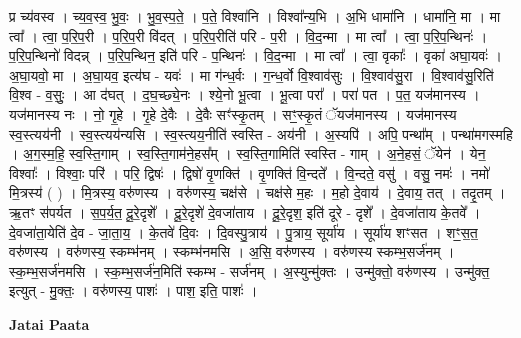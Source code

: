 \documentclass[17pt]{extarticle}
\begin{document}
प्र च्य॑वस्व । च्य॒व॒स्व॒ भु॒वः॒ । भु॒व॒स्प॒ते॒ । प॒ते॒ विश्वा॑नि । विश्वा᳚न्य॒भि । अ॒भि धामा॑नि । धामा॑नि॒ मा । मा त्वा᳚ । त्वा॒ प॒रि॒प॒री । प॒रि॒प॒री वि॑दत् । प॒रि॒प॒रीति॑ परि - प॒री । वि॒द॒न्मा । मा त्वा᳚ । त्वा॒ प॒रि॒प॒न्थिनः॑ । प॒रि॒प॒न्थिनो॑ विदन्न् । प॒रि॒प॒न्थिन॒ इति॑ परि - प॒न्थिनः॑ । वि॒द॒न्मा । मा त्वा᳚ । त्वा॒ वृकाः᳚ । वृका॑ अघा॒यवः॑ । अ॒घा॒यवो॒ मा । अ॒घा॒यव॒ इत्य॑घ - यवः॑ । मा ग॑न्ध॒र्वः । ग॒न्ध॒र्वो वि॒श्वाव॑सुः । वि॒श्वाव॑सु॒रा । वि॒श्वाव॑सु॒रिति॑ वि॒श्व - व॒सुः॒ । आ द॑घत् । द॒घ॒च्छ्ये॒नः । श्ये॒नो भू॒त्वा । भू॒त्वा परा᳚ । परा॑ पत । प॒त॒ यज॑मानस्य । यज॑मानस्य नः । नो॒ गृ॒हे । गृ॒हे दे॒वैः । दे॒वैः सꣳ॑स्कृ॒तम् । सꣳ॒॒स्कृ॒तं ॅयज॑मानस्य । यज॑मानस्य स्व॒स्त्यय॑नी । स्व॒स्त्यय॑न्यसि । स्व॒स्त्यय॒नीति॑ स्वस्ति - अय॑नी । अ॒स्यपि॑ । अपि॒ पन्था᳚म् । पन्था॑मगस्महि । अ॒ग॒स्म॒हि॒ स्व॒स्ति॒गाम् । स्व॒स्ति॒गाम॑ने॒हस᳚म् । स्व॒स्ति॒गामिति॑ स्वस्ति - गाम् । अ॒ने॒हसं॒ ॅयेन॑ । येन॒ विश्वाः᳚ । विश्वाः॒ परि॑ । परि॒ द्विषः॑ । द्विषो॑ वृ॒णक्ति॑ । वृ॒णक्ति॑ वि॒न्दते᳚ । वि॒न्दते॒ वसु॑ । वसु॒ नमः॑ । नमो॑ मि॒त्रस्य॑ ( ) । मि॒त्रस्य॒ वरु॑णस्य । वरु॑णस्य॒ चक्ष॑से । चक्ष॑से म॒हः । म॒हो दे॒वाय॑ । दे॒वाय॒ तत् । तदृ॒तम् । ऋ॒तꣳ स॑पर्यत । स॒प॒र्य॒त॒ दू॒रे॒दृशे᳚ । दू॒रे॒दृशे॑ दे॒वजा॑ताय । दू॒रे॒दृश॒ इति॑ दूरे - दृशे᳚ । दे॒वजा॑ताय के॒तवे᳚ । दे॒वजा॑ता॒येति॑ दे॒व - जा॒ता॒य॒ । के॒तवे॑ दि॒वः । दि॒वस्पु॒त्राय॑ । पु॒त्राय॒ सूर्या॑य । सूर्या॑य शꣳसत । शꣳ॒॒स॒त॒ वरु॑णस्य । वरु॑णस्य॒ स्कम्भ॑नम् । स्कम्भ॑नमसि । अ॒सि॒ वरु॑णस्य । वरु॑णस्य स्कम्भ॒सर्ज॑नम् । 
स्क॒म्भ॒सर्ज॑नमसि । स्क॒म्भ॒सर्ज॑न॒मिति॑ स्कम्भ - सर्ज॑नम् । अ॒स्युन्मु॑क्तः । उन्मु॑क्तो॒ वरु॑णस्य । उन्मु॑क्त॒ इत्युत् - मु॒क्तः॒ । वरु॑णस्य॒ पाशः॑ । पाश॒ इति॒ पाशः॑ । \newline

\textbf{Jatai Paata} \newline
\end{document}
